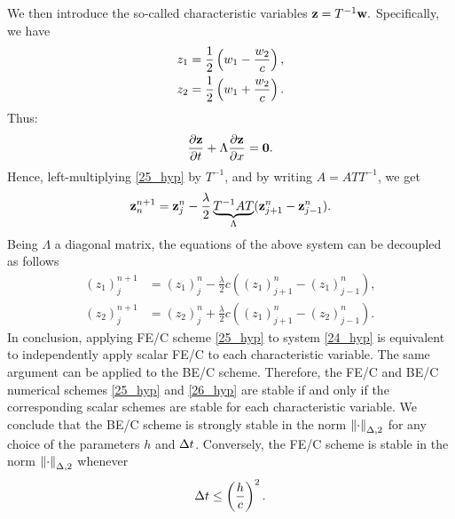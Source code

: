 We then introduce the so-called characteristic variables \(\textbf{z} = T^{-1}\textbf{w}.\) Specifically, we have 
\begin{equation}
    \begin{aligned}
        z_1 &= \frac{1}{2} \left( w_1 - \frac{w_2}{c} \right), \\ 
        z_2 &= \frac{1}{2} \left( w_1 + \frac{w_2}{c} \right).
    \end{aligned}
    \label{27_hyp}
\end{equation}
Thus: 
\[
    \partialderivative{\vect{z}}{t} + \Lambda \partialderivative{\vect{z}}{x} = \vect{0}.
\]
Hence, left-multiplying \eqref{25_hyp} by \(T^{-1}\), and by writing \(A = ATT^{-1}\), we get 
\begin{equation}
    \textbf{z}^{n+1}_n = \textbf{z}_j^n - \frac{\lambda}{2} \underbrace{T^{-1}AT}_{\Lambda} (\textbf{z}^n_{j+1} - \textbf{z}^n_{j-1}).
    \label{28_hyp}
\end{equation}
Being \(\Lambda\) a diagonal matrix, the equations of the above system can be decoupled as follows
\begin{align*}
    (z_1)^{n+1}_j &= (z_1)^n_j -\frac{\lambda}{2} c ((z_1)^n_{j+1} - (z_1)^n_{j-1}), \\
    (z_2)^{n+1}_j &= (z_2)_j^n +\frac{\lambda}{2} c ((z_1)^n_{j+1} - (z_2)^n_{j-1}).
\end{align*}
In conclusion, applying FE/C scheme \eqref{25_hyp} to system \eqref{24_hyp} is equivalent to independently apply scalar FE/C to each characteristic variable. The same argument can be applied to the BE/C scheme. Therefore, the FE/C and BE/C numerical schemes \eqref{25_hyp} and \eqref{26_hyp} are stable if and only if the corresponding scalar schemes are stable for each characteristic variable. We conclude that the BE/C scheme is strongly stable in the norm \(\norm{\cdot}_{\Delta, 2}\) for any choice of the parameters \(h\) and \(\Delta t\). Conversely, the FE/C scheme is stable in the norm \(\norm{\cdot}_{\Delta, 2}\) whenever 
\begin{equation}
    \Delta t \leq \left( \frac{h}{c} \right)^2.
    \label{29_hyp}
\end{equation}
